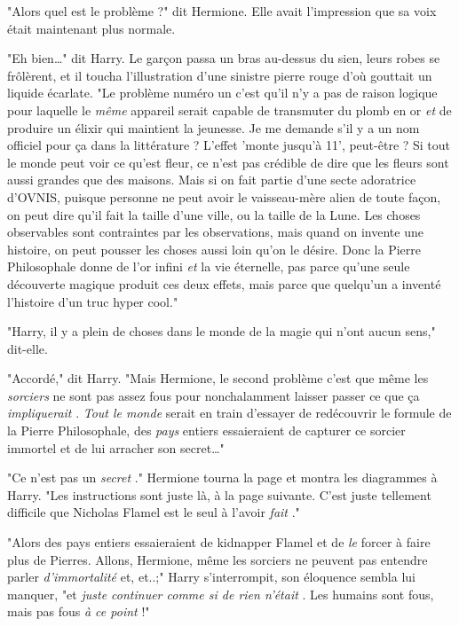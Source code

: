 "Alors quel est le problème ?" dit Hermione. Elle avait l'impression que sa voix était maintenant plus normale.

"Eh bien…" dit Harry. Le garçon passa un bras au-dessus du sien, leurs robes se frôlèrent, et il toucha l'illustration d'une sinistre pierre rouge d'où gouttait un liquide écarlate. "Le problème numéro un c'est qu'il n'y a pas de raison logique pour laquelle le \emph{même}  appareil serait capable de transmuter du plomb en or \emph{et}  de produire un élixir qui maintient la jeunesse. Je me demande s'il y a un nom officiel pour ça dans la littérature ? L'effet 'monte jusqu'à 11', peut-être ? Si tout le monde peut voir ce qu'est fleur, ce n'est pas crédible de dire que les fleurs sont aussi grandes que des maisons. Mais si on fait partie d'une secte adoratrice d'OVNIS, puisque personne ne peut avoir le vaisseau-mère alien de toute façon, on peut dire qu'il fait la taille d'une ville, ou la taille de la Lune. Les choses observables sont contraintes par les observations, mais quand on invente une histoire, on peut pousser les choses aussi loin qu'on le désire. Donc la Pierre Philosophale donne de l'or infini \emph{et}  la vie éternelle, pas parce qu'une seule découverte magique produit ces deux effets, mais parce que quelqu'un a inventé l'histoire d'un truc hyper cool."

"Harry, il y a plein de choses dans le monde de la magie qui n'ont aucun sens," dit-elle.

"Accordé," dit Harry. "Mais Hermione, le second problème c'est que même les \emph{sorciers}  ne sont pas assez fous pour nonchalamment laisser passer ce que ça \emph{impliquerait} . \emph{Tout le monde}  serait en train d'essayer de redécouvrir le formule de la Pierre Philosophale, des \emph{pays}  entiers essaieraient de capturer ce sorcier immortel et de lui arracher son secret…"

"Ce n'est pas un \emph{secret} ." Hermione tourna la page et montra les diagrammes à Harry. "Les instructions sont juste là, à la page suivante. C'est juste tellement difficile que Nicholas Flamel est le seul à l'avoir \emph{fait} ."

"Alors des pays entiers essaieraient de kidnapper Flamel et de \emph{le}  forcer à faire plus de Pierres. Allons, Hermione, même les sorciers ne peuvent pas entendre parler \emph{d'immortalité}  et, et..;" Harry s'interrompit, son éloquence sembla lui manquer, "et \emph{juste continuer comme si de rien n'était} . Les humains sont fous, mais pas fous \emph{à ce point}  !"

